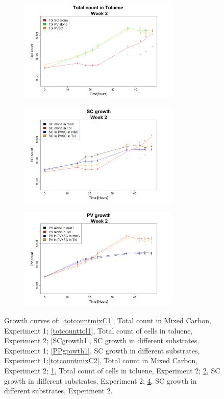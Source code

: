 \documentclass[a4paper, 10pt, conference]{ieeeconf}   %
\begin{document}
\begin{landscape}
\begin{figure}
\begin{subfigure}{.47\textheight}
			\includegraphics[width=7.71cm]{totcount_tol2.png}
			\caption{}
			\label{totcounttol2}
		\end{subfigure}%
		\begin{subfigure}{.47\textheight}
			\centering
			\vspace{-0cm}	
			\includegraphics[width=7.71cm]{SCgrowth2.png}
			\caption{}
			\label{SCgrowth2}
		\end{subfigure}%
		\begin{subfigure}{.47\textheight}
			\centering
			\vspace{-0cm}
			\includegraphics[width=7.71cm]{PVgrowth2.png}
			\caption{}
			\label{PVgrowth2}
		\end{subfigure}
		
		\caption{ Growth curves of: \ref{totcountmixC1}, Total count in Mixed Carbon, Experiment 1; \ref{totcounttol1}, Total count of cells in toluene, Experiment 2; \ref{SCgrowth1}, SC growth in different substrates, Experiment 1; \ref{PPgrowth1}, SC growth in different substrates, Experiment 1;\ref{totcountmixC2}, Total count in Mixed Carbon, Experiment 2; \ref{totcounttol2}, Total count of cells in toluene, Experiment 2; \ref{SCgrowth2}, SC growth in different substrates, Experiment 2; \ref{PVgrowth2}, SC growth in different substrates, Experiment 2.}
		
		
	\end{figure}
\end{landscape}
\end{document}
